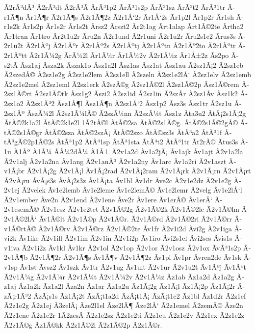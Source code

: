 {Ã­2rÃ³dÃ³
Ã­2rÃ³dt
Ã­2rÃ³Ã­
Ã­rÃ³1p2
Ã­rÃ³1s2p
Ã­rÃ³1sz
Ã­rÃ³t2
Ã­rÃ³1tr
Ã­r1Ã¶n
Ã­r1Ã¶r
Ã­2r1Ã¶s
Ã­2r1Ã¶2z
Ã­2r1Å‘2r
Ã­r1Å‘2s
Ã­r1p2l
Ã­r1p2r
Ã­r1sh
Ã­r1s2k
Ã­r1s2p
Ã­r1s2r
Ã­r1s2t
Ã­rsz2
Ã­rszt2
Ã­r2t1ag
Ã­rt1alap
Ã­rt1Ã©2te
Ã­rtha2
Ã­r1tran
Ã­r1tro
Ã­r2t1u2r
Ã­ru2n
Ã­2r1und
Ã­2r1uni
Ã­2r1u2r
Ã­ru2s1e2
Ã­rus3s
Ã­2r1u2t
Ã­2r1Ãºj
Ã­2r1Ãºr
Ã­2r1Ãº2s
Ã­2r1Ãºtj
Ã­2r1Ãºtn
Ã­2r1Ãº2to
Ã­2r1Ãºtr
Ã­2r1Ãºtt
Ã­2r1Ã¼2g
Ã­rÃ¼2l
Ã­r1Ã¼r
Ã­r1Ã¼2v
Ã­2r1Ã¼z
Ã­r1Å±2z
Ã­s2po
Ã­s2tÃ­
Ã­sz1aj
Ã­sza2k
Ã­szak1o
Ã­sz1a2l
Ã­sz1as
Ã­sz1at
Ã­sz1au
Ã­2sz1Ã¡2
Ã­2sz1eb
Ã­2szedÃ©
Ã­2sz1e2g
Ã­2sz1e2lem
Ã­2sz1ell
Ã­2szeln
Ã­2sz1e2lÅ‘
Ã­2sz1elv
Ã­2sz1emb
Ã­2sz1e2mel
Ã­2sz1eml
Ã­2sz1erk
Ã­2szÃ©g
Ã­2sz1Ã©2l
Ã­2sz1Ã©2p
Ã­sz1Ã©rem
Ã­2sz1Ã©rt
Ã­2sz1Ã©tk
Ã­sz1g2
Ã­szi2
Ã­2sz1id
Ã­2sz1in
Ã­2szÃ­r
Ã­2sz1Ã­v
Ã­sz1k2
Ã­2sz1o2
Ã­2sz1Ã³2
Ã­sz1Ã¶l
Ã­sz1Ã¶n
Ã­2sz1Å‘2
Ã­sz1p2
Ã­sz3s
Ã­sz1tr
Ã­2sz1u
Ã­2sz1Ãº
Ã­szÃ¼2l
Ã­2sz1Ã¼lÃ©
Ã­2szÃ¼nn
Ã­2szÃ¼t
Ã­sz1z
Ã­ta3u2
Ã­tÃ¡2s1Ã¡2g
Ã­tÃ©2k1a2l
Ã­tÃ©2k1e2l
1Ã­2tÃ©l
Ã­tÃ©2sa
Ã­tÃ©2s1Ã©g.
Ã­tÃ©2s1Ã©2gÃ©
Ã­tÃ©2s1Ã©gr
Ã­tÃ©2sza
Ã­tÃ©2szÃ¡
Ã­tÃ©2szo
Ã­tÃ©sz3s
Ã­tÃ³a2
Ã­tÃ³1f
Ã­tÃ³gÃ©2p1Ã©2s
Ã­tÃ³1p2
Ã­tÃ³1sp
Ã­tÃ³1sta
Ã­tÃ³t2
Ã­tÃ³1tr
Ã­t2rÃ©
Ã­tus3s
Ã­1u
Ã­1Ãº
Ã­1Ã¼
Ã­Ã¼2dÃ¼
Ã­1Å±
Ã­2v1a2d
Ã­v1a2jÃ¡
Ã­v1ajk
Ã­v1ajt
Ã­2v1a2la
Ã­2v1alj
Ã­2v1a2na
Ã­v1ang
Ã­2v1anÃ³
Ã­2v1a2ny
Ã­v1arc
Ã­v1a2ri
Ã­2v1aszt
Ã­v1Ã¡br
Ã­2v1Ã¡2g
Ã­2v1Ã¡l
Ã­v1Ã¡2rad
Ã­2v1Ã¡2ram
Ã­2v1Ã¡rk
Ã­2v1Ã¡rn
Ã­2v1Ã¡rt
Ã­2vÃ¡ru
Ã­vÃ¡s3s
Ã­vÃ¡2s3z
Ã­v1Ã¡ta
Ã­v1bl
Ã­v1dr
Ã­ve2c
Ã­2v1e2dz
Ã­2v1e2g
Ã­2v1ej
Ã­2velek
Ã­v1e2lemb
Ã­v1e2leme
Ã­v1e2lemÃ©
Ã­v1e2lemr
Ã­2velg
Ã­v1e2lÅ‘l
Ã­2v1ember
Ã­ve2n
Ã­2v1end
Ã­2v1ene
Ã­ve2r
Ã­v1ere
Ã­v1erÃ©
Ã­v1erÅ‘
Ã­2v1esemÃ©
Ã­2v1esz
Ã­2v1e2tet
Ã­2v1Ã©2g
Ã­2v1Ã©2k
Ã­2v1Ã©2le
Ã­2v1Ã©lm
Ã­2v1Ã©2lÅ‘
Ã­v1Ã©lt
Ã­2v1Ã©p
Ã­2v1Ã©r.
Ã­2v1Ã©rd
Ã­2v1Ã©2ri
Ã­2v1Ã©rr
Ã­v1Ã©rtÃ©
Ã­2v1Ã©rv
Ã­2v1Ã©rz
Ã­2v1Ã©2te
Ã­v1fr
Ã­2v1i2d
Ã­vi2g
Ã­2v1iga
Ã­vi2k
Ã­v1ike
Ã­2v1ill
Ã­2v1im
Ã­2v1in
Ã­2v1i2p
Ã­v1iro
Ã­vi2s1el
Ã­vi2ses
Ã­vis1s
Ã­v1iva
Ã­2v1i2z
Ã­v1kl
Ã­v1kr
Ã­2v1ol
Ã­2v1op
Ã­2v1or
Ã­2v1osz
Ã­2v1ox
Ã­vÃ³1s2p
Ã­2v1Ã¶b
Ã­2v1Ã¶2r
Ã­2v1Ã¶s
Ã­v1Ã¶v
Ã­2v1Ã¶2z
Ã­v1pl
Ã­v1pr
Ã­vren2de
Ã­v1sk
Ã­v1sp
Ã­v1st
Ã­vsz2
Ã­v1szk
Ã­v1tr
Ã­2v1ug
Ã­v1ult
Ã­2v1ur
Ã­2v1u2t
Ã­v1Ãºj
Ã­v1Ãºt
Ã­2v1Ã¼g
Ã­2v1Ã¼r
Ã­2v1Ã¼t
Ã­2v1Ã¼2v
Ã­2v1Ã¼z
Ã­z1ab
Ã­z1a2d
Ã­z1a2g
Ã­z1aj
Ã­z1a2k
Ã­z1a2l
Ã­za2n
Ã­z1ar
Ã­z1a2u
Ã­z1Ã¡2g
Ã­z1Ã¡l
Ã­z1Ã¡2p
Ã­z1Ã¡2r
Ã­zÃ¡r1Ã³2
Ã­zÃ¡s1s
Ã­z1Ã¡2t
Ã­zÃ¡t1a2d
Ã­zÃ¡t1Ã¡
Ã­zÃ¡t1e2
Ã­z1bl
Ã­z1d2r
Ã­2z1ef
Ã­2z1e2g
Ã­2z1ej
Ã­3zelÃ¡
Ã­ze2l1el
Ã­ze2lÃ¶
Ã­ze2lÅ‘
Ã­2z1emel
Ã­2zemÃ©
Ã­ze2n
Ã­2z1ene
Ã­2z1e2r
1Ã­2zesÃ­
Ã­2z1e2sz
Ã­2z1e2ti
Ã­2z1eu
Ã­2z1e2v
Ã­2z1ex
Ã­2z1e2z
Ã­2z1Ã©g
Ã­z1Ã©kk
Ã­2z1Ã©2l
Ã­2z1Ã©2p
Ã­2z1Ã©r.
}
